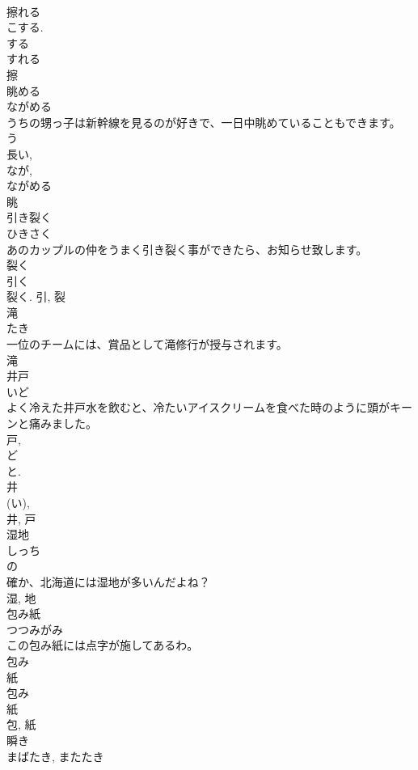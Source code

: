 \documentclass[8pt]{extreport}
\begin{document}
\begin{CJK}{UTF8}{min}
\\	擦れる 
\\	こする. 
\\	する
\\	すれる
\\	擦	
\\	眺める	
\\	ながめる	
\\	うちの甥っ子は新幹線を見るのが好きで、一日中眺めていることもできます。	
\\	う 
\\	長い, 
\\	なが, 
\\	ながめる
\\	眺	
\\	引き裂く	
\\	ひきさく	
\\	あのカップルの仲をうまく引き裂く事ができたら、お知らせ致します。	
\\	裂く 
\\	引く 
\\	裂く.	引, 裂	
\\	滝	
\\	たき	
\\	一位のチームには、賞品として滝修行が授与されます。	
\\	滝	
\\	井戸	
\\	いど	
\\	よく冷えた井戸水を飲むと、冷たいアイスクリームを食べた時のように頭がキーンと痛みました。	
\\	戸, 
\\	ど 
\\	と. 
\\	井 
\\	(い), 
\\	井, 戸	
\\	湿地	
\\	しっち	
\\	の 
\\	確か、北海道には湿地が多いんだよね？	
\\	湿, 地	
\\	包み紙	
\\	つつみがみ	
\\	この包み紙には点字が施してあるわ。	
\\	包み 
\\	紙 
\\	包み 
\\	紙 
\\	包, 紙	
\\	瞬き	
\\	まばたき, またたき	

\end{CJK}
\end{document}
